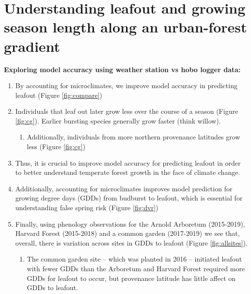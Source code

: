 \documentclass{article}\usepackage[]{graphicx}\usepackage[]{color}
\begin{document}
\renewcommand{\thetable}{\arabic{table}}
\renewcommand{\thefigure}{\arabic{figure}}
\renewcommand{\labelitemi}{$-$}

\renewcommand{\thesection}{\arabic{section}.}
\renewcommand\thesubsection{\arabic{section}.\arabic{subsection}} 

\section*{Understanding leafout and growing season length along an urban-forest gradient}

\large{\textbf{Exploring model accuracy using weather station vs hobo logger data:}
\begin{enumerate}
\item By accounting for microclimates, we improve model accuracy in predicting leafout (Figure \ref{fig:compare})
\item Individuals that leaf out later grow less over the course of a season (Figure \ref{fig:cg}). Earlier bursting species generally grow faster (think willow).
  \begin{enumerate}
  \item Additionally, individuals from more northern provenance latitudes grow less (Figure \ref{fig:cg})
  \end{enumerate}
\item Thus, it is crucial to improve model accuracy for predicting leafout in order to better understand temperate forest growth in the face of climate change. 
\item Additionally, accounting for microclimates improves model prediction for growing degree days (GDDs) from budburst to leafout, which is essential for understanding false spring risk (Figure \ref{fig:dvr})
\item Finally, using phenology observations for the Arnold Arboretum (2015-2019), Harvard Forest (2015-2018) and a common garden (2017-2019) we see that, overall, there is variation across sites in GDDs to leafout (Figure \ref{fig:allsites}). 
  \begin{enumerate}
  \item The common garden site -- which was planted in 2016 -- initiated leafout with fewer GDDs than the Arboretum and Harvard Forest required more GDDs for leafout to occur, but provenance latitude has little affect on GDDs to leafout. 
  \end{enumerate}
\end{enumerate}

}
\end{document}
